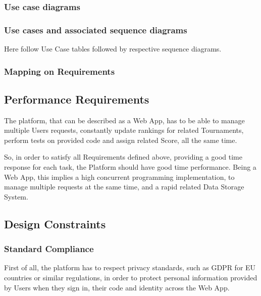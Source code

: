 \newpage

\subsubsection{Use case diagrams}

\newpage

\subsubsection{Use cases and associated sequence diagrams}
Here follow Use Case tables followed by respective sequence diagrams.


\subsubsection{Mapping on Requirements}

\subsection{Performance Requirements}
The platform, that can be described as a Web App, has to be able to manage multiple Users requests, constantly update rankings for related Tournaments, perform tests on provided code and assign related Score, all the same time. 

So, in order to satisfy all Requirements defined above, providing a good time response for each task, the Platform should have good time performance. Being a Web App, this implies a high concurrent programming implementation, to 
manage multiple requests at the same time, and a rapid related Data Storage System. 

\subsection{Design Constraints}

\subsubsection{Standard Compliance}
First of all, the platform has to respect privacy standards, such as GDPR for EU countries or similar regulations, in order to protect personal information provided by Users when they sign in, their code and identity across the Web App.

